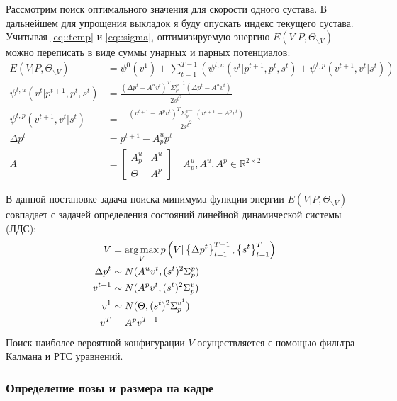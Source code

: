Рассмотрим поиск оптимального значения для скорости одного сустава. В дальнейшем для упрощения выкладок я буду опускать индекс текущего сустава. Учитывая \eqref{eq::temp} и \eqref{eq::sigma}, оптимизируемую энергию $E(V|P, \Theta_{\backslash V})$ можно переписать в виде суммы унарных и парных потенциалов:
\begin{equation}
	\begin{aligned}
		E(V|P, \Theta_{\backslash V}) &= \psi^0(v^1) + \sum_{t=1}^{T-1} \left( \psi^{t,u}(v^t|p^{t+1}, p^{t}, s^t) + \psi^{t,p}(v^{t+1}, v^{t}|s^t) \right) \\		
		\psi^{t,u}(v^t|p^{t+1}, p^{t}, s^t) &= \frac{(\Delta p^t - A^u v^t)^T {\Sigma_p^p}^{-1} (\Delta p^t - A^u v^t)} {2 {s^t}^2} \\
		\psi^{t,p}(v^{t+1}, v^{t}|s^t) &= -\frac{(v^{t+1} - A^p v^t)^T {\Sigma_p^v}^{-1} (v^{t+1} - A^p v^t)} {2 {s^t}^2} \\ 
		\Delta p^t &= p^{t+1} - A_p^u p^t \\
		A &= \left[
		\begin{array}{c|c}
		A_p^u  & A^u \\ \hline
		\Theta & A^p
		\end{array}
		\right] \quad
		A_p^u, A^u, A^p \in \mathbb{R}^{2 \times 2}
	\end{aligned}
\end{equation}

В данной постановке задача поиска минимума функции энергии $E(V|P, \Theta_{\backslash V})$ совпадает с задачей определения состояний линейной динамической системы (ЛДС):
\begin{equation}
\begin{aligned}
	V &= \operatorname*{arg\,max}_V {p\left(V | \left\{\Delta p^t\right\}_{t=1}^{T-1}, \left\{s^t\right\}_{t=1}^T\right)} \\ 
	\Delta p^t &\sim N(A^u v^t, (s^t)^2\Sigma_p^p) \\
	v^{t+1} &\sim N(A^p v^t, (s^t)^2\Sigma_p^v) \\
	v^1 &\sim N(\Theta, (s^t)^2\Sigma_p^{v^1}) \\
	v^T &= A^p v^{T-1}
\end{aligned}
\end{equation}
Поиск наиболее вероятной конфигурации $V$ осуществляется с помощью фильтра Калмана и РТС уравнений.

\subsubsection{Определение позы и размера на кадре}


